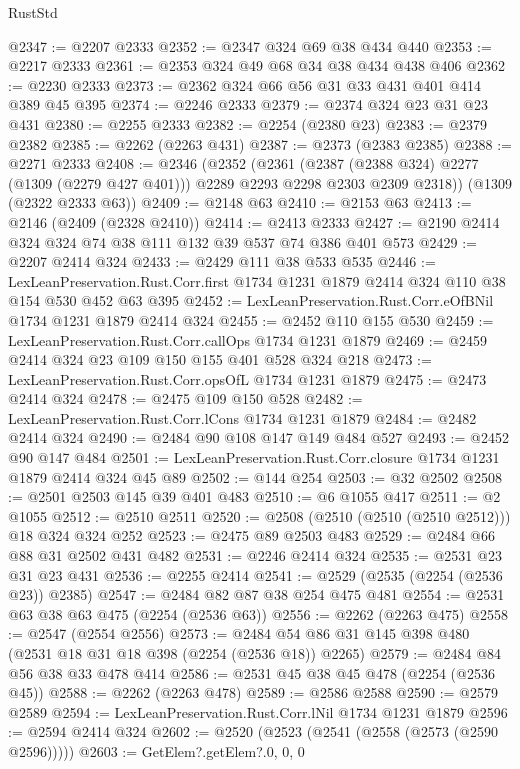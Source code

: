 \begin{lexlean}{RustStd}
\begin{coremodule}
@2347 := @2207 @2333
@2352 := @2347 @324 @69 @38 @434 @440
@2353 := @2217 @2333
@2361 := @2353 @324 @49 @68 @34 @38 @434 @438 @406
@2362 := @2230 @2333
@2373 := @2362 @324 @66 @56 @31 @33 @431 @401 @414 @389 @45 @395
@2374 := @2246 @2333
@2379 := @2374 @324 @23 @31 @23 @431
@2380 := @2255 @2333
@2382 := @2254 (@2380 @23)
@2383 := @2379 @2382
@2385 := @2262 (@2263 @431)
@2387 := @2373 (@2383 @2385)
@2388 := @2271 @2333
@2408 := @2346
    (@2352
      (@2361
        (@2387 (@2388 @324) @2277 (@1309 (@2279 @427 @401)))
        @2289
        @2293
        @2298
        @2303
        @2309
        @2318))
    (@1309 (@2322 @2333 @63))
@2409 := @2148 @63
@2410 := @2153 @63
@2413 := @2146 (@2409 (@2328 @2410))
@2414 := @2413 @2333
@2427 := @2190 @2414 @324 @324 @74 @38 @111 @132 @39 @537 @74 @386 @401 @573
@2429 := @2207 @2414 @324
@2433 := @2429 @111 @38 @533 @535
@2446 := LexLeanPreservation.Rust.Corr.first
    @1734
    @1231
    @1879
    @2414
    @324
    @110
    @38
    @154
    @530
    @452
    @63
    @395
@2452 := LexLeanPreservation.Rust.Corr.eOfBNil @1734 @1231 @1879 @2414 @324
@2455 := @2452 @110 @155 @530
@2459 := LexLeanPreservation.Rust.Corr.callOps @1734 @1231 @1879
@2469 := @2459 @2414 @324 @23 @109 @150 @155 @401 @528 @324 @218
@2473 := LexLeanPreservation.Rust.Corr.opsOfL @1734 @1231 @1879
@2475 := @2473 @2414 @324
@2478 := @2475 @109 @150 @528
@2482 := LexLeanPreservation.Rust.Corr.lCons @1734 @1231 @1879
@2484 := @2482 @2414 @324
@2490 := @2484 @90 @108 @147 @149 @484 @527
@2493 := @2452 @90 @147 @484
@2501 := LexLeanPreservation.Rust.Corr.closure @1734 @1231 @1879 @2414 @324 @45 @89
@2502 := @144 @254
@2503 := @32 @2502
@2508 := @2501 @2503 @145 @39 @401 @483
@2510 := @6 @1055 @417
@2511 := @2 @1055
@2512 := @2510 @2511
@2520 := @2508 (@2510 (@2510 (@2510 @2512))) @18 @324 @324 @252
@2523 := @2475 @89 @2503 @483
@2529 := @2484 @66 @88 @31 @2502 @431 @482
@2531 := @2246 @2414 @324
@2535 := @2531 @23 @31 @23 @431
@2536 := @2255 @2414
@2541 := @2529 (@2535 (@2254 (@2536 @23)) @2385)
@2547 := @2484 @82 @87 @38 @254 @475 @481
@2554 := @2531 @63 @38 @63 @475 (@2254 (@2536 @63))
@2556 := @2262 (@2263 @475)
@2558 := @2547 (@2554 @2556)
@2573 := @2484 @54 @86 @31 @145 @398 @480 (@2531 @18 @31 @18 @398 (@2254 (@2536 @18)) @2265)
@2579 := @2484 @84 @56 @38 @33 @478 @414
@2586 := @2531 @45 @38 @45 @478 (@2254 (@2536 @45))
@2588 := @2262 (@2263 @478)
@2589 := @2586 @2588
@2590 := @2579 @2589
@2594 := LexLeanPreservation.Rust.Corr.lNil @1734 @1231 @1879
@2596 := @2594 @2414 @324
@2602 := @2520 (@2523 (@2541 (@2558 (@2573 (@2590 @2596)))))
@2603 := GetElem?.getElem?.{0, 0, 0}

\end{coremodule}
\end{lexlean}
